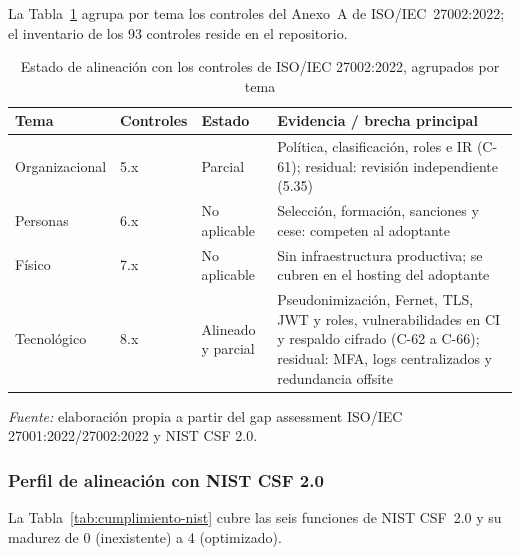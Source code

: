 La Tabla~\ref{tab:cumplimiento-iso} agrupa por tema los controles del Anexo~A de ISO/IEC~27002:2022; el inventario de los 93 controles reside en el repositorio.

\begin{table}[htbp]
\centering
\caption{Estado de alineación con los controles de ISO/IEC 27002:2022, agrupados por tema}
\label{tab:cumplimiento-iso}
\footnotesize\singlespacing
\setlength{\tabcolsep}{4pt}
\begin{tabular}{@{}>{\raggedright\arraybackslash}p{2.2cm} >{\raggedright\arraybackslash}p{1.4cm} >{\raggedright\arraybackslash}p{1.7cm} >{\raggedright\arraybackslash}p{10.5cm}@{}}
\toprule
\textbf{Tema} & \textbf{Controles} & \textbf{Estado} & \textbf{Evidencia / brecha principal} \\
\midrule
Organizacional & 5.x & Parcial & Política, clasificación, roles e IR (C-61); residual: revisión independiente (5.35) \\
Personas & 6.x & No aplicable & Selección, formación, sanciones y cese: competen al adoptante \\
Físico & 7.x & No aplicable & Sin infraestructura productiva; se cubren en el hosting del adoptante \\
Tecnológico & 8.x & Alineado y parcial & Pseudonimización, Fernet, TLS, JWT y roles, vulnerabilidades en CI y respaldo cifrado (C-62 a C-66); residual: MFA, logs centralizados y redundancia offsite \\
\bottomrule
\end{tabular}
\par
{\footnotesize\textit{Fuente:} elaboración propia a partir del gap assessment ISO/IEC 27001:2022/27002:2022 y NIST CSF 2.0.\par}
\end{table}

\subsubsection{Perfil de alineación con NIST CSF 2.0}\label{subsec:cumplimiento-nist}

La Tabla~\ref{tab:cumplimiento-nist} cubre las seis funciones de NIST CSF~2.0 y su madurez de 0 (inexistente) a 4 (optimizado).


